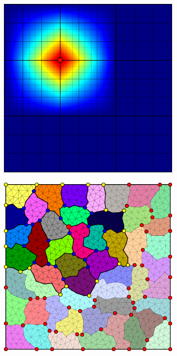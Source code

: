 \begin{figure}[htbp]
\begin{subfigure}[t]{0.3\textwidth}
  \end{subfigure}
  \hfill
  \begin{subfigure}[t]{0.3\textwidth}
    \centerline{\includegraphics[width=0.9\linewidth]{figs/square/square_cart_struct_node_ml_lvl2_basis}}
  \end{subfigure}
  \par\bigskip
  \begin{subfigure}[t]{0.3\textwidth}
    \centerline{\includegraphics[width=0.9\linewidth]{figs/square/square_tria_metis_node_ml_lvl1_grid}}

\end{subfigure}
\end{figure}
